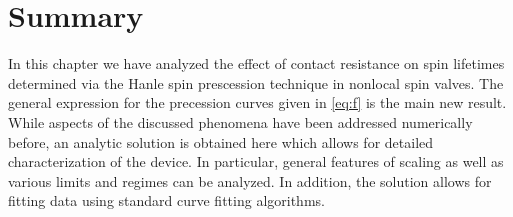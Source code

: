 \section{Summary}
\label{s:summary}

In this chapter we have analyzed the effect of contact resistance
on spin lifetimes determined via the Hanle spin prescession technique
in nonlocal spin valves.
The general expression for the precession curves given
in \cref{eq:f} is the main new result.
While aspects of the discussed phenomena have been addressed numerically before,
an analytic solution is obtained here
which allows for detailed characterization of the device.
In particular, general features of scaling
as well as various limits and regimes can be analyzed.
In addition, the solution allows for fitting data
using standard curve fitting algorithms.
